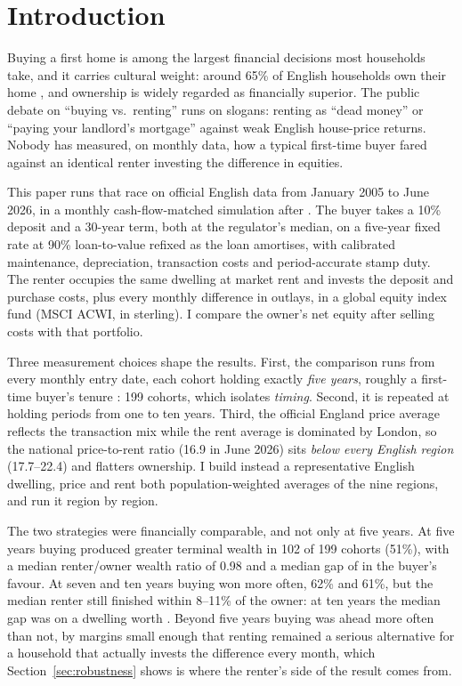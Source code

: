 
\section{Introduction}
\label{sec:introduction}

Buying a first home is among the largest financial decisions most households take, and it carries cultural weight: around 65\% of English households own their home \parencite{ehs2024}, and ownership is widely regarded as financially superior. The public debate on ``buying vs.\ renting'' runs on slogans: renting as ``dead money'' or ``paying your landlord's mortgage'' against weak English house-price returns. Nobody has measured, on monthly data, how a typical first-time buyer fared against an identical renter investing the difference in equities.

This paper runs that race on official English data from January 2005 to June 2026, in a monthly cash-flow-matched simulation after \textcite{beracha2012}. The buyer takes a 10\% deposit and a 30-year term, both at the regulator's median, on a five-year fixed rate at 90\% loan-to-value refixed as the loan amortises, with calibrated maintenance, depreciation, transaction costs and period-accurate stamp duty. The renter occupies the same dwelling at market rent and invests the deposit and purchase costs, plus every monthly difference in outlays, in a global equity index fund (MSCI ACWI, in sterling). I compare the owner's net equity after selling costs with that portfolio.

Three measurement choices shape the results. First, the comparison runs from every monthly entry date, each cohort holding exactly \emph{five years}, roughly a first-time buyer's tenure \parencite{santander_tenure}: 199 cohorts, which isolates \emph{timing}. Second, it is repeated at holding periods from one to ten years. Third, the official England price average reflects the transaction mix while the rent average is dominated by London, so the national price-to-rent ratio (16.9 in June 2026) sits \emph{below every English region} (17.7--22.4) and flatters ownership. I build instead a representative English dwelling, price and rent both population-weighted averages of the nine regions, and run it region by region.

The two strategies were financially comparable, and not only at five years. At five years buying produced greater terminal wealth in 102 of 199 cohorts (51\%), with a median renter/owner wealth ratio of 0.98 and a median gap of  in the buyer's favour. At seven and ten years buying won more often, 62\% and 61\%, but the median renter still finished within 8--11\% of the owner: at ten years the median gap was  on a dwelling worth . Beyond five years buying was ahead more often than not, by margins small enough that renting remained a serious alternative for a household that actually invests the difference every month, which Section~\ref{sec:robustness} shows is where the renter's side of the result comes from.

